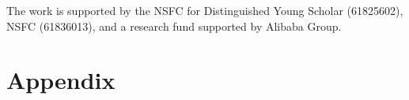 \documentclass[sigconf]{acmart}
\begin{document}
\begin{acks}
The work is supported by the
NSFC for Distinguished Young Scholar 
(61825602),
NSFC (61836013), 
and a research fund supported by Alibaba Group.
\end{acks}




\appendix
\section{Appendix}
\label{sec:appendix}

\end{document}

